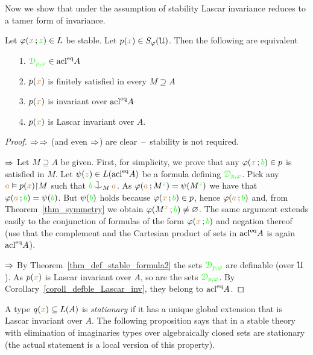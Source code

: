 Now we show that under the assumption of stability Lascar invariance reduces to a tamer form of invariance.

\begin{proposition}\label{prop_type_over_acl2}
  Let $\varphi({\color{brown} x}\,;{\color{green} z})\in L$ be stable.
  Let $p({\color{brown} x})\in S_\varphi(\EuScript U)$. 
  Then the following are equivalent
  \begin{itemize}
  \item[1.] ${\color{green}\EuScript D_{p,\varphi}}\in \mathop{\rm acl}^{{\rm eq}}\!A$
  \item[2.] $p({\color{brown} x})$ is finitely satisfied in every $M\supseteq A$
  \item[3.] $p({\color{brown} x})$ is invariant over $\mathop{\rm acl}^{{\rm eq}}\!A$
  \item[4.] $p({\color{brown} x})$ is Lascar invariant over $A$.
  \end{itemize}
\end{proposition}
\begin{proof}
  $\Rightarrow$$\Rightarrow$ (and even $\Rightarrow$) are clear~--~stability is not required.

  $\Rightarrow$
  Let $M\supseteq A$ be given.
  First, for simplicity, we prove that any $\varphi({\color{brown} x}\,;{\color{green} b})\in p$ is satisfied in $M$.
  Let $\psi({\color{green} z})\in L(\mathop{\rm acl}^{{\rm eq}}\!A)$ be a formula defining ${\color{green}\EuScript D_{p,\varphi}}$.
  Pick any ${\color{brown} a}\vDash p({\color{brown} x}){\restriction} M$ such that ${\gr b}\cnonfork_M{\mr a}$.
  As $\varphi({\color{brown} a}\,;M^{\color{green} z})=\psi(M^{\color{green} z})$ we have that $\varphi({\color{brown} a}\,;{\color{green} b})=\psi({\color{green} b})$.
  But $\psi({\color{green} b})$ holds because $\varphi({\color{brown} x}\,;{\color{green} b})\in p$, hence $\varphi({\color{brown} a}\,;{\color{green} b})$ and, from Theorem~\ref{thm_symmetry} we obtain $\varphi(M^{\color{brown} x}\,;{\color{green} b})\neq\varnothing$.
  The same argument extends easily to the conjunction of formulas of the form $\varphi({\color{brown} x}\,;{\color{green} b})$ and negation thereof (use that the complement and the Cartesian product of sets in $\mathop{\rm acl}^{{\rm eq}}\!A$ is again $\mathop{\rm acl}^{{\rm eq}}\!A$).
 
  $\Rightarrow$ By Theorem~\ref{thm_def_stable_formula2} the sets ${\color{green}\EuScript D_{p,\varphi}}$ are definable (over $\EuScript U$).
  As $p({\color{brown} x})$ is Lascar invariant over $A$, so are the sets ${\color{green}\EuScript D_{p,\varphi}}$.
  By Corollary~\ref{coroll_defble_Lascar_inv}, they belong to $\mathop{\rm acl}^{{\rm eq}}\!A$.
\end{proof}

A type $q({\color{brown} x})\subseteq L(A)$ is \emph{stationary\/} if it has a unique global extension that is Lascar invariant over $A$.
The following proposition says that in a stable theory with elimination of imaginaries types over algebraically closed sets are stationary (the actual statement is a local version of this property).

